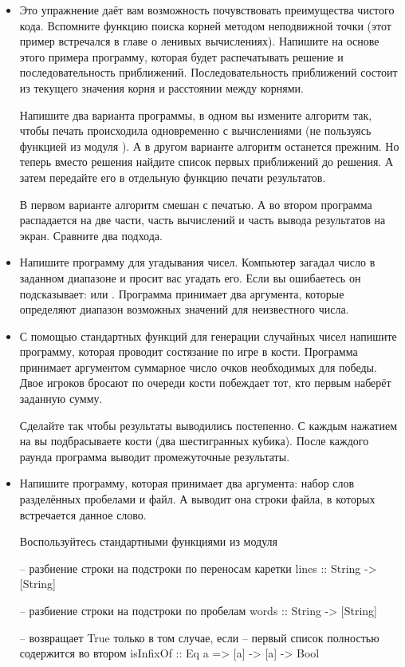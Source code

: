 \begin{itemize}

\item Это упражнение даёт вам возможность почувствовать
    преимущества чистого кода. Вспомните функцию поиска
    корней методом неподвижной точки (этот пример встречался
    в главе о ленивых вычислениях). Напишите на основе
    этого примера программу, которая будет распечатывать
    решение и последовательность приближений. Последовательность
    приближений состоит из текущего значения корня и 
    расстоянии между корнями. 

    Напишите два варианта программы, в одном вы измените алгоритм
    так, чтобы печать происходила одновременно с вычислениями 
    (не пользуясь функцией из модуля ). 
    А в другом варианте алгоритм останется прежним. Но
    теперь вместо решения найдите список первых приближений до
    решения. А затем передайте его в отдельную функцию 
    печати результатов.

    В первом варианте алгоритм смешан с печатью. А во втором
    программа распадается на две части, часть вычислений и
    часть вывода результатов на экран. Сравните два подхода.
    
\item Напишите программу для угадывания чисел. Компьютер
    загадал число в заданном диапазоне и просит вас угадать его.
    Если вы ошибаетесь он подсказывает: 
    или . Программа принимает два аргумента,
    которые определяют диапазон возможных значений для неизвестного
    числа.

\item С помощью стандартных функций для генерации случайных
    чисел напишите программу, которая проводит состязание
    по игре в кости. Программа принимает аргументом суммарное число
    очков необходимых для победы. Двое игроков бросают по очереди 
    кости побеждает тот, кто первым наберёт заданную сумму.

    Сделайте так чтобы результаты выводились постепенно. С каждым
    нажатием на  вы подбрасываете кости (два 
    шестигранных кубика). После каждого раунда программа выводит 
    промежуточные результаты.
    

\item Напишите программу, которая принимает два аргумента:
    набор слов разделённых пробелами и файл. А выводит она
    строки файла, в которых встречается данное слово. 

    Воспользуйтесь стандартными функциями из модуля 

\begin{code}
-- разбиение строки на подстроки по переносам каретки
lines :: String -> [String]

-- разбиение строки на подстроки по пробелам
words :: String -> [String]

-- возвращает True только в том случае, если 
-- первый список полностью содержится во втором
isInfixOf :: Eq a => [a] -> [a] -> Bool
\end{code}
\end{itemize}



